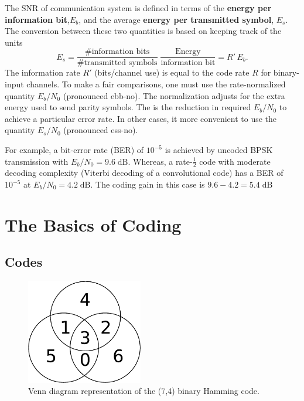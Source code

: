 The SNR of communication system is defined in terms of the \textbf{energy per information bit},$E_{b}$, and the average \textbf{energy per transmitted symbol}, $E_{s}$.
The conversion between these two quantities is based on keeping track of the units
\[E_{s}=\frac{\mbox{\# information bits}}{\mbox{\# transmitted symbols}}\;\frac{\mbox{Energy}}{\mbox{information bit}}=R'\, E_{b}. \]
The information rate $R'$ (bits/channel use) is equal to the code rate $R$ for binary-input channels.
To make a fair comparisons, one must use the rate-normalized quantity $E_{b}/N_{0}$ (pronounced ebb-no).
The normalization adjusts for the extra energy used to send parity symbols.
The  is the reduction in required $E_b / N_0$ to achieve a particular error rate.
In other cases, it more convenient to use the quantity $E_{s}/N_{0}$ (pronounced ess-no).

For example, a bit-error rate (BER) of $10^{-5}$ is achieved by uncoded BPSK transmission with $E_{b}/N_{0}=9.6\;\mathrm{dB}$.
Whereas, a rate-$\frac{1}{2}$ code with moderate decoding complexity (Viterbi decoding of a convolutional code) has a BER of $10^{-5}$ at $E_{b}/N_{0}=4.2\;\mathrm{dB}$.
The coding gain in this case is $9.6-4.2=5.4\;\mathrm{dB}$

\section{The Basics of Coding}

\subsection{Codes}

\begin{figure}[t]
\begin{center}
\includegraphics[width=2in,keepaspectratio]{Figures/hammvenn}
\end{center}
\vspace{-4mm}
\caption{Venn diagram representation of the (7,4) binary Hamming code.}
\end{figure}

